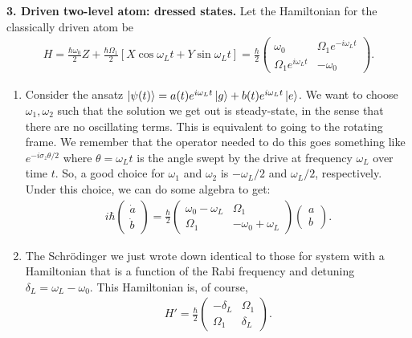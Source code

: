 \documentclass{article}
\theoremstyle{definition}
\newcommand{\f}[2]{\frac{#1}{#2}}
\newcommand{\lb}{\left[}
\newcommand{\rb}{\right]}
\begin{document}
\noindent \textbf{3. Driven two-level atom: dressed states.} Let the Hamiltonian for the classically driven atom be
\begin{align*}
H = \f{\hbar \omega_0 }{2}Z + \f{\hbar \Omega_1}{2} \lb X \cos \omega_L t + Y \sin \omega_L t \rb
= \f{\hbar }{2} 
\begin{pmatrix}
\omega_0 & \Omega_1 e^{-i \omega_L t} \\ 
\Omega_1 e^{i \omega_L t} & -\omega_0 
\end{pmatrix}.
\end{align*}
 
\begin{enumerate}[label=(\alph*)]

\item Consider the ansatz $\ket{\psi(t)} = a(t) e^{i \omega_L t} \ket{g} + b(t) e^{i \omega_L t} \ket{e}$. We want to choose $\omega_1, \omega_2$ such that the solution we get out is steady-state, in the sense that there are no oscillating terms. This is equivalent to going to the rotating frame. We remember that the operator needed to do this goes something like $e^{-i \sigma_z \theta /2}$ where $\theta = \omega_L t$ is the angle swept by the drive at frequency $\omega_L$ over time $t$. So, a good choice for $\omega_1$ and $\omega_2$ is $-\omega_L/2$ and $\omega_L/2$, respectively. \\

Under this choice, we can do some algebra to get:
\begin{align*}
i\hbar \begin{pmatrix}
\dot{a} \\ \dot{b}
\end{pmatrix}
=
\f{\hbar}{2}
\begin{pmatrix}
\omega_0  - \omega_L & \Omega_1 \\
\Omega_1 & -\omega_0 + \omega_L 
\end{pmatrix}
\begin{pmatrix}
a \\ b
\end{pmatrix}.
\end{align*}



\item The Schr\"{o}dinger we just wrote down identical to those for system with a Hamiltonian that is a function of the Rabi frequency and detuning $\delta_L = \omega_L - \omega_0$. This Hamiltonian is, of course,
\begin{align*}
H' = \f{\hbar}{2} \begin{pmatrix}
-\delta_L & \Omega_1 \\ \Omega_1 & \delta_L
\end{pmatrix}.
\end{align*}


\end{enumerate}
\end{document}
